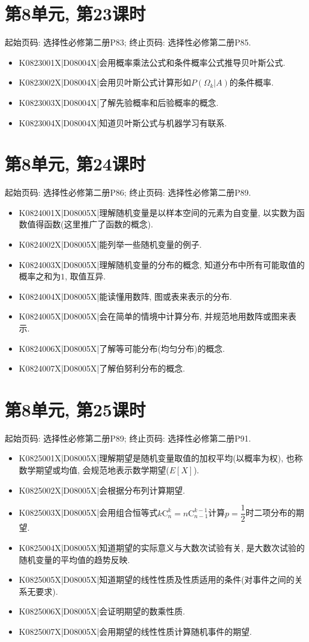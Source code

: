 \section*{第8单元, 第23课时}
起始页码: 选择性必修第二册P83; 终止页码: 选择性必修第二册P85.
\begin{itemize}
\item K0823001X|D08004X|会用概率乘法公式和条件概率公式推导贝叶斯公式.
\item K0823002X|D08004X|会用贝叶斯公式计算形如$P(\Omega_k|A)$的条件概率.
\item K0823003X|D08004X|了解先验概率和后验概率的概念.
\item K0823004X|D08004X|知道贝叶斯公式与机器学习有联系.
\end{itemize}

\section*{第8单元, 第24课时}
起始页码: 选择性必修第二册P86; 终止页码: 选择性必修第二册P89.
\begin{itemize}
\item K0824001X|D08005X|理解随机变量是以样本空间的元素为自变量, 以实数为函数值得函数(这里推广了函数的概念).
\item K0824002X|D08005X|能列举一些随机变量的例子.
\item K0824003X|D08005X|理解随机变量的分布的概念, 知道分布中所有可能取值的概率之和为$1$, 取值互异.
\item K0824004X|D08005X|能读懂用数阵, 图或表来表示的分布.
\item K0824005X|D08005X|会在简单的情境中计算分布, 并规范地用数阵或图来表示.
\item K0824006X|D08005X|了解等可能分布(均匀分布)的概念.
\item K0824007X|D08005X|了解伯努利分布的概念.
\end{itemize}

\section*{第8单元, 第25课时}
起始页码: 选择性必修第二册P89; 终止页码: 选择性必修第二册P91.
\begin{itemize}
\item K0825001X|D08005X|理解期望是随机变量取值的加权平均(以概率为权), 也称数学期望或均值, 会规范地表示数学期望($E[X]$).
\item K0825002X|D08005X|会根据分布列计算期望.
\item K0825003X|D08005X|会用组合恒等式$k\mathrm{C}_n^k=n\mathrm{C}_{n-1}^{k-1}$计算$p=\dfrac 12$时二项分布的期望.
\item K0825004X|D08005X|知道期望的实际意义与大数次试验有关, 是大数次试验的随机变量的平均值的趋势反映.
\item K0825005X|D08005X|知道期望的线性性质及性质适用的条件(对事件之间的关系无要求).
\item K0825006X|D08005X|会证明期望的数乘性质.
\item K0825007X|D08005X|会用期望的线性性质计算随机事件的期望.
\end{itemize}

